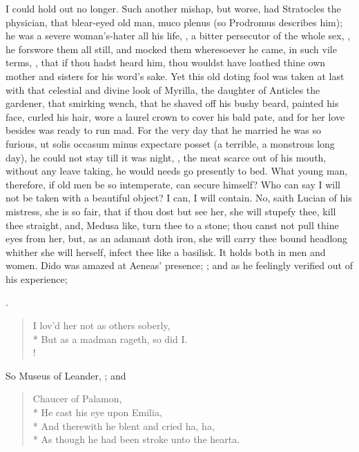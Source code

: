 I could hold out no longer. Such another mishap, but worse, had
Stratocles the physician, that blear-eyed old man, muco plenus (so
Prodromus describes him); he was a severe woman's-hater all his
life, , a bitter
persecutor of the whole sex, , he
forswore them all still, and mocked them wheresoever he came, in such
vile terms, , that if thou hadst heard him,
thou wouldst have loathed thine own mother and sisters for his word's
sake. Yet this old doting fool was taken at last with that celestial
and divine look of Myrilla, the daughter of Anticles the gardener, that
smirking wench, that he shaved off his bushy beard, painted his face,
curled his hair, wore a laurel crown to cover his bald pate, and
for her love besides was ready to run mad. For the very day that he
married he was so furious, ut solis occasum minus expectare posset (a
terrible, a monstrous long day), he could not stay till it was night,
, the meat scarce
out of his mouth, without any leave taking, he would needs go presently
to bed. What young man, therefore, if old men be so intemperate, can
secure himself? Who can say I will not be taken with a beautiful
object? I can, I will contain. No, saith Lucian of his mistress,
she is so fair, that if thou dost but see her, she will stupefy thee,
kill thee straight, and, Medusa like, turn thee to a stone; thou canst
not pull thine eyes from her, but, as an adamant doth iron, she will
carry thee bound headlong whither she will herself, infect thee like a
basilisk. It holds both in men and women. Dido was amazed at Aeneas'
presence; ; and as he feelingly
verified out of his experience;

.

\begin{verse}
I lov'd her not as others soberly,\\*
But as a madman rageth, so did I.\\!
\end{verse}

So Museus of Leander, ; and

\begin{verse}
Chaucer of Palamon,\\*
He cast his eye upon Emilia,\\*
And therewith he blent and cried ha, ha,\\*
As though he had been stroke unto the hearta.
\end{verse}

